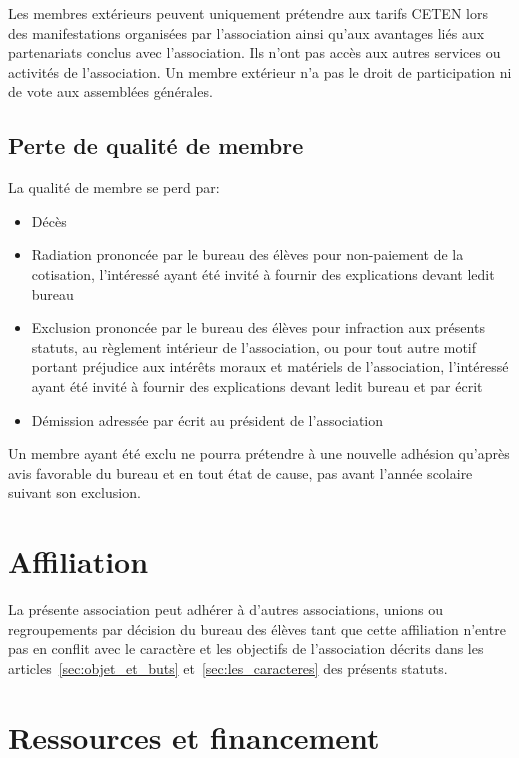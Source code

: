 \documentclass{article}
\begin{document}
				Les membres extérieurs peuvent uniquement prétendre aux tarifs
				CETEN lors des manifestations organisées par l’association ainsi
				qu’aux avantages liés aux partenariats conclus avec
				l’association. Ils n’ont pas accès aux autres services ou
				activités de l’association. Un membre extérieur n’a pas le droit
				de participation ni de vote aux assemblées générales.

		\subsection{Perte de qualité de membre}
\label{sub:perte_de_qualite_de_membre}
			La qualité de membre se perd par:
			\begin{itemize}
				\item Décès
				\item Radiation prononcée par le bureau des élèves pour
					non-paiement de la cotisation, l'intéressé ayant été invité
					à fournir des explications devant ledit bureau
				\item Exclusion prononcée par le bureau des élèves pour
					infraction aux présents statuts, au règlement intérieur de
					l'association, ou pour tout autre motif portant préjudice
					aux intérêts moraux et matériels de l’association,
					l'intéressé ayant été invité à fournir des explications
					devant ledit bureau et par écrit
				\item Démission adressée par écrit au président de l’association
			\end{itemize}

			Un membre ayant été exclu ne pourra prétendre à une nouvelle
			adhésion qu’après avis favorable du bureau et en tout état de cause,
			pas avant l’année scolaire suivant son exclusion.

	\section{Affiliation}
\label{sec:affiliation}
		La présente association peut adhérer à d’autres associations, unions ou
		regroupements par décision du bureau des élèves tant que cette
		affiliation n’entre pas en conflit avec le caractère et les objectifs de
		l’association décrits dans les articles~\ref{sec:objet_et_buts}
		et~\ref{sec:les_caracteres} des présents statuts.

	\section{Ressources et financement}
\label{sec:ressources_et_financement}
\end{document}

